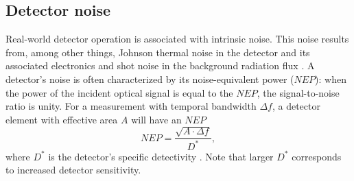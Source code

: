 \subsection{Detector noise}
\graffito{\textcolor{red}{check signs and write more clearly}}
Real-world detector operation is associated with intrinsic noise.
This noise results from, among other things,
Johnson thermal noise in the detector and its associated electronics
and shot noise in the background radiation flux
\cite{hamamatsu_ir_detectors}.
A detector's noise is often characterized by
its noise-equivalent power ($NEP$):
when the power of the incident optical signal is equal to the $NEP$,
the signal-to-noise ratio is unity.
For a measurement with temporal bandwidth $\Delta f$,
a detector element with effective area $A$
will have an $NEP$
\begin{equation}
  NEP = \frac{\sqrt{A \cdot \Delta f}}{D^{*}},
\end{equation}
where $D^{*}$ is the detector's specific detectivity
\cite{jones_josa60}.
Note that larger $D^{*}$ corresponds to increased detector sensitivity.

